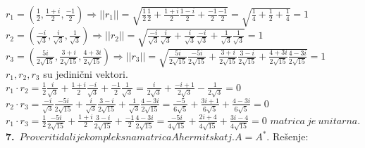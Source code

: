 \documentclass{article}
\begin{document}
$r_1 = (\frac{1}{2}, \frac{1+i}{2}, \frac{-1}{2}) \Rightarrow 
||r_1|| = \sqrt{\frac{1}{2}\frac{1}{2} + \frac{1+i}{2}\frac{1-i}{2} +
\frac{-1}{2}\frac{-1}{2}} = \sqrt{\frac{1}{4} + \frac{1}{2} + \frac{1}{4}} = 1$
\newline
\hspace*{0.5cm}$r_2 = (\frac{-i}{\sqrt{3}}, \frac{i}{\sqrt{3}}, \frac{1}{\sqrt{3}}) \Rightarrow 
||r_2|| = \sqrt{\frac{-i}{\sqrt{3}}\frac{i}{\sqrt{3}} + \frac{i}{\sqrt{3}}\frac{-i}{\sqrt{3}} +
\frac{1}{\sqrt{3}}\frac{1}{\sqrt{3}}} = 1$
\newline
\hspace*{0.5cm}$r_3 = (\frac{5i}{2\sqrt{15}}, \frac{3+i}{2\sqrt{15}}, \frac{4+3i}{2\sqrt{15}}) \Rightarrow 
||r_3|| = \sqrt{\frac{5i}{2\sqrt{15}}\frac{-5i}{2\sqrt{15}} + \frac{3+i}{2\sqrt{15}}\frac{3-i}{2\sqrt{15}} +
\frac{4+3i}{2\sqrt{15}}\frac{4-3i}{2\sqrt{15}}} = 1$
\vspace{0.1cm}\newline
\hspace*{0.5cm}\Rightarrow $r_1, r_2, r_3$ su jedinični vektori.
\vspace{0.2cm}\newline
\hspace*{0.5cm}$r_1 \cdot r_2 = \frac{1}{2}\frac{i}{\sqrt{3}} + \frac{1+i}{2}\frac{-i}{\sqrt{3}} + \frac{-1}{2}\frac{1}{\sqrt{3}} =
\frac{i}{2\sqrt{3}} + \frac{-i+1}{2\sqrt{3}} - \frac{1}{2\sqrt{3}} = 0$
\newline 
\hspace*{0.5cm}$r_2 \cdot r_3 = \frac{-i}{\sqrt{3}}\frac{-5i}{2\sqrt{15}} + \frac{i}{\sqrt{3}}\frac{3-i}{2\sqrt{15}} + \frac{1}{\sqrt{3}}\frac{4-3i}{2\sqrt{15}} =
\frac{-5}{6\sqrt{5}} + \frac{3i+1}{6\sqrt{5}} + \frac{4-3i}{6\sqrt{5}} = 0$
\newline 
\hspace*{0.5cm}$r_1 \cdot r_3 = \frac{1}{2}\frac{-5i}{2\sqrt{15}} + \frac{1+i}{2}\frac{3-i}{2\sqrt{15}} + \frac{-1}{2}\frac{4-3i}{2\sqrt{15}} =
\frac{-5i}{4\sqrt{15}} + \frac{2i+4}{4\sqrt{15}} + \frac{3i-4}{4\sqrt{15}} = 0$
\vspace{0.2cm}\newline
\hspace*{0.5cm} \Rightarrow $matrica\ je\ unitarna$.
\newline
\textbf{7.}\ $Proveriti da li je kompleksna matrica A hermitska tj. A = A^*$.
\vspace*{0.4cm}\newline
Rešenje: \newline
\end{document}
